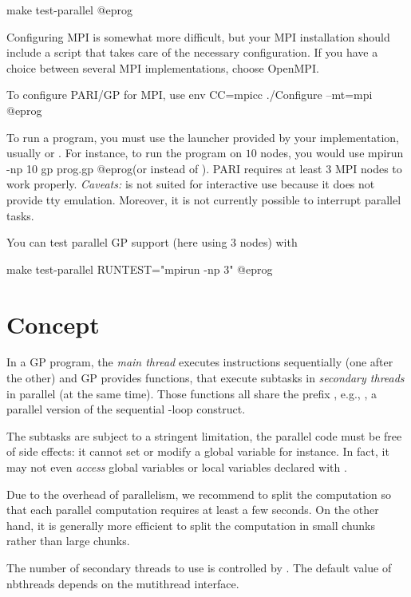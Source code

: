 \bprog
make test-parallel
@eprog


Configuring MPI is somewhat more difficult, but your MPI installation should
include a script  that takes care of the necessary configuration.
If you have a choice between several MPI implementations, choose OpenMPI.

To configure PARI/GP for MPI, use
\bprog
env CC=mpicc ./Configure --mt=mpi
@eprog

To run a program, you must use the launcher provided by your implementation,
usually  or . For instance, to run
the program  on $10$ nodes, you would use
\bprog
  mpirun -np 10 gp prog.gp
@eprog\noindent (or  instead of ). PARI
requires at least $3$ MPI nodes to work properly. \emph{Caveats:}
 is not suited for interactive use because it does not provide
tty emulation. Moreover, it is not currently possible to interrupt parallel
tasks.

You can test parallel GP support (here using 3 nodes) with

\bprog
make test-parallel RUNTEST="mpirun -np 3"
@eprog

\section{Concept}

In a GP program, the \emph{main thread} executes instructions sequentially
(one after the other) and GP provides functions, that execute subtasks in
\emph{secondary threads} in parallel (at the same time). Those functions all
share the prefix , e.g., , a parallel version of the
sequential -loop construct.

The subtasks are subject to a stringent limitation, the parallel code
must be free of side effects: it cannot set or modify a global variable
for instance. In fact, it may not even \emph{access} global variables or
local variables declared with .

Due to the overhead of parallelism, we recommend to split the computation so
that each parallel computation requires at least a few seconds. On the other
hand, it is generally more efficient to split the computation in small chunks
rather than large chunks.


The number of secondary threads to use is controlled by
. The default value of nbthreads depends on the
mutithread interface.

